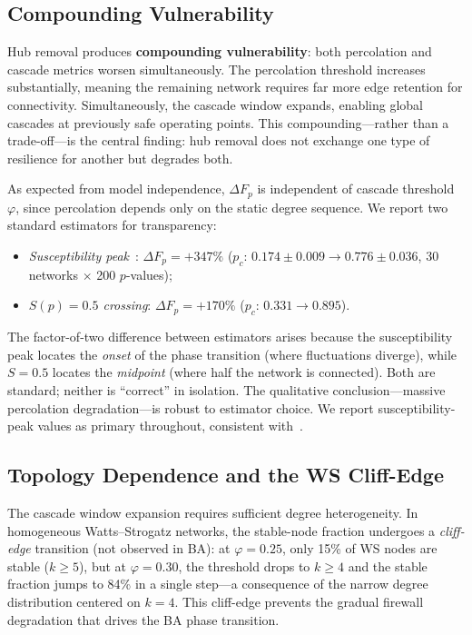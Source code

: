 \documentclass[aps,pre,twocolumn,superscriptaddress,showpacs]{revtex4-2}
\newcommand{\pc}{p_c}
\newcommand{\DF}{\Delta F}
\begin{document}
\subsection{Compounding Vulnerability}
\label{sec:compounding}

Hub removal produces \textbf{compounding vulnerability}: both percolation and cascade metrics worsen simultaneously. The percolation threshold increases substantially, meaning the remaining network requires far more edge retention for connectivity. Simultaneously, the cascade window expands, enabling global cascades at previously safe operating points. This compounding---rather than a trade-off---is the central finding: hub removal does not exchange one type of resilience for another but degrades both.

As expected from model independence, $\DF_p$ is independent of cascade threshold $\varphi$, since percolation depends only on the static degree sequence. We report two standard estimators for transparency:
\begin{itemize}
\item \emph{Susceptibility peak}~\cite{Newman2001}: $\DF_p = +347\%$ ($\pc$: $0.174 \pm 0.009 \to 0.776 \pm 0.036$, 30 networks $\times$ 200 $p$-values);
\item \emph{$S(p) = 0.5$ crossing}: $\DF_p = +170\%$ ($\pc$: $0.331 \to 0.895$).
\end{itemize}
The factor-of-two difference between estimators arises because the susceptibility peak locates the \emph{onset} of the phase transition (where fluctuations diverge), while $S=0.5$ locates the \emph{midpoint} (where half the network is connected). Both are standard; neither is ``correct'' in isolation. The qualitative conclusion---massive percolation degradation---is robust to estimator choice. We report susceptibility-peak values as primary throughout, consistent with~\cite{Newman2001}.

\subsection{Topology Dependence and the WS Cliff-Edge}
\label{sec:topology}

The cascade window expansion requires sufficient degree heterogeneity. In homogeneous Watts--Strogatz networks, the stable-node fraction undergoes a \emph{cliff-edge} transition (not observed in BA): at $\varphi=0.25$, only 15\% of WS nodes are stable ($k \geq 5$), but at $\varphi=0.30$, the threshold drops to $k \geq 4$ and the stable fraction jumps to 84\% in a single step---a consequence of the narrow degree distribution centered on $k=4$. This cliff-edge prevents the gradual firewall degradation that drives the BA phase transition.
\end{document}
